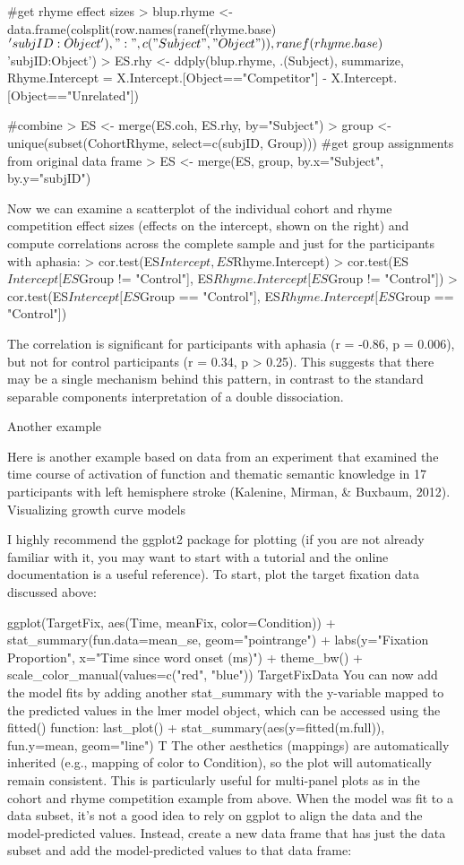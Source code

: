 #get rhyme effect sizes
> blup.rhyme <- data.frame(colsplit(row.names(ranef(rhyme.base)$'subjID:Object'), ":", c("Subject", "Object")), ranef(rhyme.base)$'subjID:Object')
> ES.rhy <- ddply(blup.rhyme, .(Subject), summarize, Rhyme.Intercept = X.Intercept.[Object=="Competitor"] - X.Intercept.[Object=="Unrelated"])

#combine
> ES <- merge(ES.coh, ES.rhy, by="Subject")
> group <- unique(subset(CohortRhyme, select=c(subjID, Group))) #get group assignments from original data frame
> ES <- merge(ES, group, by.x="Subject", by.y="subjID")

 Now we can examine a scatterplot of the individual cohort and rhyme competition effect sizes (effects on the intercept, shown on the right) and compute correlations across the complete sample and just for the participants with aphasia:
> cor.test(ES$Intercept, ES$Rhyme.Intercept)
> cor.test(ES$Intercept[ES$Group != "Control"], ES$Rhyme.Intercept[ES$Group != "Control"])
> cor.test(ES$Intercept[ES$Group == "Control"], ES$Rhyme.Intercept[ES$Group == "Control"])

The correlation is significant for participants with aphasia (r = -0.86, p = 0.006), but not for control participants (r = 0.34, p > 0.25). This suggests that there may be a single mechanism behind this pattern, in contrast to the standard separable components interpretation of a double dissociation. 

Another example

Here is another example based on data from an experiment that examined the time course of activation of function and thematic semantic knowledge in 17 participants with left hemisphere stroke (Kalenine, Mirman, & Buxbaum, 2012).
Visualizing growth curve models

I highly recommend the ggplot2 package for plotting (if you are not already familiar with it, you may want to start with a tutorial and the online documentation is a useful reference). To start, plot the target fixation data discussed above:

ggplot(TargetFix, aes(Time, meanFix, color=Condition)) + 
  stat_summary(fun.data=mean_se, geom="pointrange") + 
  labs(y="Fixation Proportion", x="Time since word onset (ms)") + 
  theme_bw() + scale_color_manual(values=c("red", "blue"))
TargetFixData
You can now add the model fits by adding another stat_summary with the y-variable mapped to the predicted values in the lmer model object, which can be accessed using the fitted() function:
last_plot() + stat_summary(aes(y=fitted(m.full)), fun.y=mean, geom="line")
 T
The other aesthetics (mappings) are automatically inherited (e.g., mapping of color to Condition), so the plot will automatically remain consistent. This is particularly useful for multi-panel plots as in the cohort and rhyme competition example from above. When the model was fit to a data subset, it's not a good idea to rely on ggplot to align the data and the model-predicted values. Instead, create a new data frame that has just the data subset and add the model-predicted values to that data frame:


